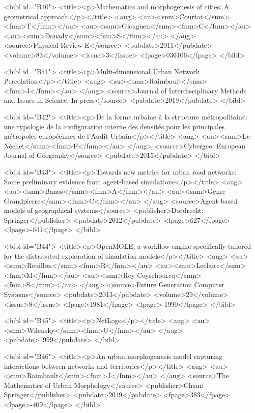 \documentclass{bmcart}
\begin{document}
\begin{backmatter}
{<bibl id="B40">
  <title><p>Mathematics and morphogenesis of cities: A geometrical
  approach</p></title>
  <aug>
    <au><snm>Courtat</snm><fnm>T</fnm></au>
    <au><snm>Gloaguen</snm><fnm>C</fnm></au>
    <au><snm>Douady</snm><fnm>S</fnm></au>
  </aug>
  <source>Physical Review E</source>
  <pubdate>2011</pubdate>
  <volume>83</volume>
  <issue>3</issue>
  <fpage>036106</fpage>
</bibl>

<bibl id="B41">
  <title><p>Multi-dimensional Urban Network Percolation</p></title>
  <aug>
    <au><snm>Raimbault</snm><fnm>J</fnm></au>
  </aug>
  <source>Journal of Interdisciplinary Methods and Issues in Science. In
  press</source>
  <pubdate>2019</pubdate>
</bibl>

<bibl id="B42">
  <title><p>De la forme urbaine {\`a} la structure m{\'e}tropolitaine: une
  typologie de la configuration interne des densit{\'e}s pour les principales
  m{\'e}tropoles europ{\'e}ennes de l'Audit Urbain</p></title>
  <aug>
    <au><snm>Le N{\'e}chet</snm><fnm>F</fnm></au>
  </aug>
  <source>Cybergeo: European Journal of Geography</source>
  <pubdate>2015</pubdate>
</bibl>

<bibl id="B43">
  <title><p>Towards new metrics for urban road networks: Some preliminary
  evidence from agent-based simulations</p></title>
  <aug>
    <au><snm>Banos</snm><fnm>A</fnm></au>
    <au><snm>Genre Grandpierre</snm><fnm>C</fnm></au>
  </aug>
  <source>Agent-based models of geographical systems</source>
  <publisher>Dordrecht: Springer</publisher>
  <pubdate>2012</pubdate>
  <fpage>627</fpage>
  <lpage>-641</lpage>
</bibl>

<bibl id="B44">
  <title><p>OpenMOLE, a workflow engine specifically tailored for the
  distributed exploration of simulation models</p></title>
  <aug>
    <au><snm>Reuillon</snm><fnm>R</fnm></au>
    <au><snm>Leclaire</snm><fnm>M</fnm></au>
    <au><snm>Rey Coyrehourcq</snm><fnm>S</fnm></au>
  </aug>
  <source>Future Generation Computer Systems</source>
  <pubdate>2013</pubdate>
  <volume>29</volume>
  <issue>8</issue>
  <fpage>1981</fpage>
  <lpage>-1990</lpage>
</bibl>

<bibl id="B45">
  <title><p>NetLogo</p></title>
  <aug>
    <au><snm>Wilensky</snm><fnm>U</fnm></au>
  </aug>
  <pubdate>1999</pubdate>
</bibl>

<bibl id="B46">
  <title><p>An urban morphogenesis model capturing interactions between
  networks and territories</p></title>
  <aug>
    <au><snm>Raimbault</snm><fnm>J</fnm></au>
  </aug>
  <source>The Mathematics of Urban Morphology</source>
  <publisher>Cham: Springer</publisher>
  <pubdate>2019</pubdate>
  <fpage>383</fpage>
  <lpage>-409</lpage>
</bibl>

}
\end{backmatter}
\end{document}
